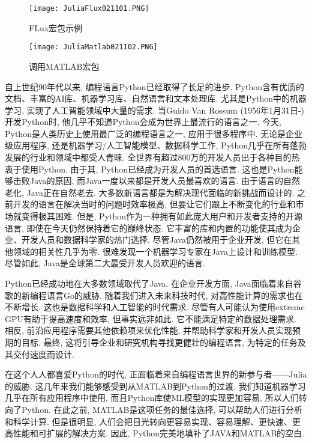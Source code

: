 \begin{figure}[H]
\centering
\texttt{[image: JuliaFlux021101.PNG]}
\caption{FLux宏包示例}
\label{JuliaFlux021101}
\end{figure}
\begin{figure}[H]
\centering
\texttt{[image: JuliaMatlab021102.PNG]}
\caption{调用MATLAB宏包}
\label{JuliaMatlab021102}
\end{figure}
自上世纪90年代以来, 编程语言Python已经取得了长足的进步.
Python含有优质的文档、丰富的AI库、机器学习库、自然语言和文本处理库. 尤其是Python中的机器学习, 实现了人工智能领域中大量的需求.
当Guido Van Rossum (1956年1月31日-)开发Python时, 他几乎不知道Python会成为世界上最流行的语言之一.
今天, Python是人类历史上使用最广泛的编程语言之一, 应用于很多程序中. 无论是企业级应用程序, 还是机器学习/人工智能模型、数据科学工作, Python几乎在所有蓬勃发展的行业和领域中都受人青睐.
全世界有超过800万的开发人员出于各种目的热衷于使用Python. 由于其, Python已经成为开发人员的首选语言. 这也是Python能够击败Java的原因,
而Java一度以来都是开发人员最喜欢的语言. 由于语言的自然老化, Java正在自然老去. 大多数新语言都是为解决现代面临的新挑战而设计的.
之前开发的语言在解决当时的问题时效率极高, 但要让它们跟上不断变化的行业和市场就变得极其困难.
但是, Python作为一种拥有如此庞大用户和开发者支持的开源语言, 即使在今天仍然保持着它的巅峰状态.
它丰富的库和内置的功能使其成为企业、开发人员和数据科学家的热门选择. 尽管Java仍然被用于企业开发, 但它在其他领域的相关性几乎为零.
很难发现一个机器学习专家在Java上设计和训练模型. 尽管如此, Java是全球第二大最受开发人员欢迎的语言.

Python已经成功地在大多数领域取代了Java. 在企业开发方面, Java面临着来自谷歌的新编程语言Go的威胁. 随着我们进入未来科技时代, 对高性能计算的需求也在不断增长. 这也是数据科学和人工智能的时代需求. 尽管有人可能认为使用extreme GPU有助于提高速度和效率, 但事实远非如此. 它不能满足特定的数据处理需求. 相反, 前沿应用程序需要其他依赖项来优化性能, 并帮助科学家和开发人员实现预期的目标. 最终, 这将引导企业和研究机构寻找更健壮的编程语言, 为特定的任务及其交付速度而设计.

在这个人人都喜爱Python的时代, 正面临着来自编程语言世界的新参与者——Julia的威胁. 这几年来我们能够感受到从MATLAB到Python的过渡. 我们知道机器学习几乎在所有应用程序中使用, 而且Python库使ML模型的实现更加容易, 所以人们转向了Python. 在此之前, MATLAB是这项任务的最佳选择, 可以帮助人们进行分析和科学计算. 但是很明显, 人们会把目光转向更容易实现、容易理解、更快速、更高性能和可扩展的解决方案. 因此, Python完美地填补了JAVA和MATLAB的空白.

